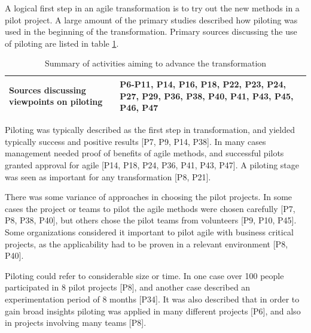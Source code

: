 \documentclass[preprint,authoryear,12pt]{elsarticle}
\begin{document}

A logical first step in an agile transformation is to try out the new methods in
a pilot project. A large amount of the primary studies described how piloting
was used in the beginning of the transformation. Primary sources discussing
the use of piloting are listed in table \ref{table:transformation_piloting}. 

\begin{table}[h]
    \centering
    \begin{tabular}{ >{\raggedright\arraybackslash}p{}
                     >{\raggedright\arraybackslash}p{} }
        \toprule
        Sources discussing viewpoints on piloting   & 
                P6-P11, P14, P16, P18, P22, P23, P24, P27, P29,
                P36, P38, P40, P41, P43, P45, P46, P47  \\
        \bottomrule
    \end{tabular}
    \caption{Summary of activities aiming to advance the transformation}
    \label{table:transformation_piloting}
\end{table}

Piloting was typically described as the first step in transformation, and
yielded typically success and positive results [P7, P9, P14, P38]. In many cases
management needed proof of benefits of agile methods, and successful pilots
granted approval for agile [P14, P18, P24, P36, P41, P43, P47].
A piloting stage was seen as important for any transformation [P8, P21].


There was some variance of approaches in choosing the pilot projects.
In some cases the project or teams to pilot the agile methods were chosen
carefully [P7, P8, P38, P40], but others chose the pilot teams from volunteers
[P9, P10, P45].
Some organizations considered it important to pilot agile with business critical
projects, as the applicability had to be proven in a relevant environment [P8,
P40].

Piloting could refer to considerable size or time. In one case over 100 people
participated in 8 pilot projects [P8], and another case described an
experimentation period of 8 months [P34].
It was also described that in order to gain broad insights piloting was applied
in many different projects [P6], and also in projects involving many teams [P8].
\end{document}
